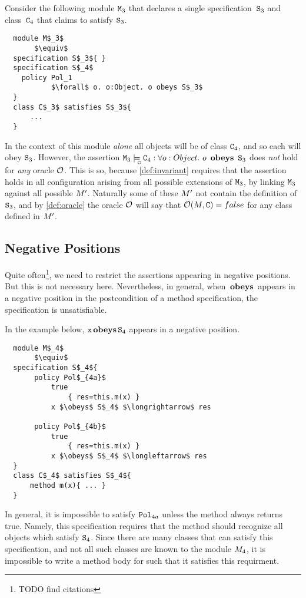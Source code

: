 Consider the following module ${\textrm{\ttfamily{M}}}_3$ that declares a single
specification~${\textrm{\ttfamily{S}}}_3$
and class~${\textrm{\ttfamily{C}}}_4$ that claims to satisfy ${\textrm{\ttfamily{S}}}_3$.

 \begin{lstlisting}
  module M$_3$
       $\equiv$
  specification S$_3${ }
  specification S$_4$
  	policy Pol_1
	       $\forall$ o. o:Object. o obeys S$_3$
  }
  class C$_3$ satisfies S$_3${
      ...
  }
\end{lstlisting}

In the context of this module \emph{alone} all objects will be of class
${\textrm{\ttfamily{C}}}_4$, and so each will obey ${\textrm{\ttfamily{S}}}_3$. However, the assertion
$\prg{M}_3 \modelsWithO  \prg{C}_4 :\forall o:Object.\ o\ \obeys\ \prg{S}_3$ does \emph{not} hold for {\em any} oracle ${\cal O}$. This is so, because \autoref{def:invariant} requires that the assertion holds in all configuration arising from all possible extensions of ${\textrm{\ttfamily{M}}}_3$, by linking
${\textrm{\ttfamily{M}}}_3$ against all possible $M'$. Naturally some of these $M'$ not contain the definition of  ${\textrm{\ttfamily{S}}}_3$, and by \autoref{def:oracle}  the oracle ${\cal O}$ will say that ${\cal O}(M,{\textrm{\ttfamily{C}}})=false$ for any class  defined in $M'$.

\subsection{Negative Positions}

Quite often\footnote{TODO find citations}, we need to restrict the assertions appearing in negative positions. But  this is not necessary here. Nevertheless, in general, when $\,\textbf{\textrm{obeys}}\,$ appears in a negative position in the postcondition of a method specification, the specification is unsatisfiable.

In the example below,    ${\textrm{\ttfamily{x}}}  \,\textbf{\textrm{obeys}}\, {\textrm{\ttfamily{S}}}{_4}$  appears in a negative position.

 \begin{lstlisting}
  module M$_4$
       $\equiv$
  specification S$_4${
       policy Pol$_{4a}$
           true
               { res=this.m(x) }
           x $\obeys$ S$_4$ $\longrightarrow$ res

       policy Pol$_{4b}$
           true
               { res=this.m(x) }
           x $\obeys$ S$_4$ $\longleftarrow$ res
  }
  class C$_4$ satisfies S$_4${
      method m(x){ ... }
  }
\end{lstlisting}

In general, it is impossible to satisfy  ${\textrm{\ttfamily{Pol}}}_{4a}$ unless the method  always returns true. Namely, this specification requires
that the method should recognize all objects which satisfy ${\textrm{\ttfamily{S}}}_4$. Since there are many classes that can satisfy this specification, and not  all such classes are known to the module $M_4$, it is impossible to write a method body for  such that it satisfies this requirment.

